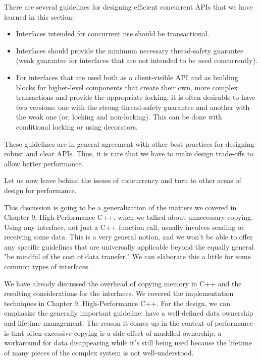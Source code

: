 There are several guidelines for designing efficient concurrent APIs that we have learned in this section:

\begin{itemize}
\item 
Interfaces intended for concurrent use should be transactional.

\item 
Interfaces should provide the minimum necessary thread-safety guarantee (weak guarantee for interfaces that are not intended to be used concurrently).

\item 
For interfaces that are used both as a client-visible API and as building blocks for higher-level components that create their own, more complex transactions and provide the appropriate locking, it is often desirable to have two versions: one with the strong thread-safety guarantee and another with the weak one (or, locking and non-locking). This can be done with conditional locking or using decorators.
\end{itemize}

These guidelines are in general agreement with other best practices for designing robust and clear APIs. Thus, it is rare that we have to make design trade-offs to allow better performance. 

Let us now leave behind the issues of concurrency and turn to other areas of design for performance.


This discussion is going to be a generalization of the matters we covered in Chapter 9, High-Performance C++, when we talked about unnecessary copying. Using any interface, not just a C++ function call, usually involves sending or receiving some data. This is a very general notion, and we won't be able to offer any specific guidelines that are universally applicable beyond the equally general "be mindful of the cost of data transfer." We can elaborate this a little for some common types of interfaces. 

We have already discussed the overhead of copying memory in C++ and the resulting considerations for the interfaces. We covered the implementation techniques in Chapter 9, High-Performance C++. For the design, we can emphasize the generally important guideline: have a well-defined data ownership and lifetime management. The reason it comes up in the context of performance is that often excessive copying is a side effect of muddled ownership, a workaround for data disappearing while it's still being used because the lifetime of many pieces of the complex system is not well-understood. 

